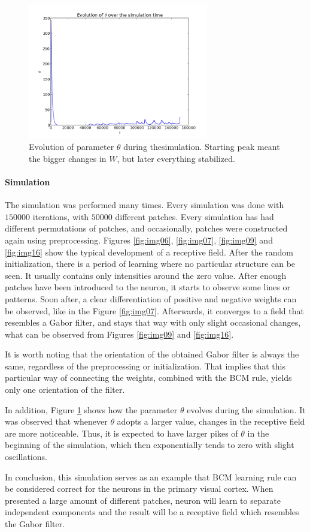 \begin{figure}[h]
\centering
\includegraphics[width=0.7\textwidth]{../ex3/results1/theta}
\caption{Evolution of parameter $\theta$ during thesimulation. Starting peak
meant the bigger changes in $W$, but later everything stabilized.}
\label{fig:theta}
\end{figure}

\paragraph{Simulation}
The simulation was performed many times. Every simulation was done with $150000$
iterations, with $50000$ different patches. Every simulation has had different
permutations of patches, and occasionally, patches were constructed again using
preprocessing. Figures \ref{fig:img06}, \ref{fig:img07}, \ref{fig:img09} and
\ref{fig:img16} show the typical development of a receptive field. After the
random initialization, there is a period of learning where no particular
structure can be seen. It usually contains only intensities around the zero
value. After enough patches have been introduced to the neuron, it starts to
observe some lines or patterns. Soon after, a clear differentiation of positive
and negative weights can be observed, like in the Figure \ref{fig:img07}.
Afterwards, it converges to a field that resembles a Gabor filter, and stays
that way with only slight occasional changes, what can be observed from Figures
\ref{fig:img09} and \ref{fig:img16}.

It is worth noting that the orientation of the obtained Gabor filter is always
the same, regardless of the preprocessing or initialization. That implies that
this particular way of connecting the weights, combined with the BCM rule,
yields only one orientation of the filter.

In addition, Figure \ref{fig:theta} shows how the parameter $\theta$ evolves
during the simulation. It was observed that whenever $\theta$ adopts a larger
value, changes in the receptive field are more noticeable. Thus, it is expected
to have larger pikes of $\theta$ in the beginning of the simulation, which then
exponentially tends to zero with slight oscillations.

In conclusion, this simulation serves as an example that BCM learning rule can
be considered correct for the neurons in the primary visual cortex. When
presented a large amount of different patches, neuron will learn to separate
independent components and the result will be a receptive field which resembles
the Gabor filter.
